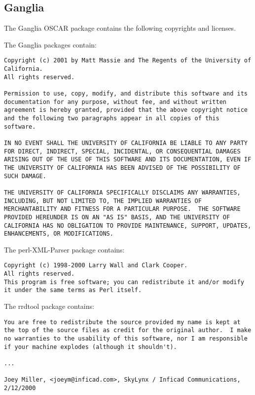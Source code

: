 %
%
%

\subsection{Ganglia}
The Ganglia OSCAR package contains the following copyrights and licenses.

The Ganglia packages contain:

\begin{verbatim}
Copyright (c) 2001 by Matt Massie and The Regents of the University of
California.
All rights reserved.

Permission to use, copy, modify, and distribute this software and its
documentation for any purpose, without fee, and without written
agreement is hereby granted, provided that the above copyright notice
and the following two paragraphs appear in all copies of this
software.

IN NO EVENT SHALL THE UNIVERSITY OF CALIFORNIA BE LIABLE TO ANY PARTY
FOR DIRECT, INDIRECT, SPECIAL, INCIDENTAL, OR CONSEQUENTIAL DAMAGES
ARISING OUT OF THE USE OF THIS SOFTWARE AND ITS DOCUMENTATION, EVEN IF
THE UNIVERSITY OF CALIFORNIA HAS BEEN ADVISED OF THE POSSIBILITY OF
SUCH DAMAGE.

THE UNIVERSITY OF CALIFORNIA SPECIFICALLY DISCLAIMS ANY WARRANTIES,
INCLUDING, BUT NOT LIMITED TO, THE IMPLIED WARRANTIES OF
MERCHANTABILITY AND FITNESS FOR A PARTICULAR PURPOSE.  THE SOFTWARE
PROVIDED HEREUNDER IS ON AN "AS IS" BASIS, AND THE UNIVERSITY OF
CALIFORNIA HAS NO OBLIGATION TO PROVIDE MAINTENANCE, SUPPORT, UPDATES,
ENHANCEMENTS, OR MODIFICATIONS.
\end{verbatim}

The perl-XML-Parser package contains:

\begin{verbatim}
Copyright (c) 1998-2000 Larry Wall and Clark Cooper.
All rights reserved.
This program is free software; you can redistribute it and/or modify
it under the same terms as Perl itself.
\end{verbatim}

The rrdtool package contains:

\begin{verbatim}
You are free to redistribute the source provided my name is kept at
the top of the source files as credit for the original author.  I make
no warranties to the usability of this software, nor I am responsible
if your machine explodes (although it shouldn't).

...

Joey Miller, <joeym@inficad.com>, SkyLynx / Inficad Communications,
2/12/2000
\end{verbatim}
